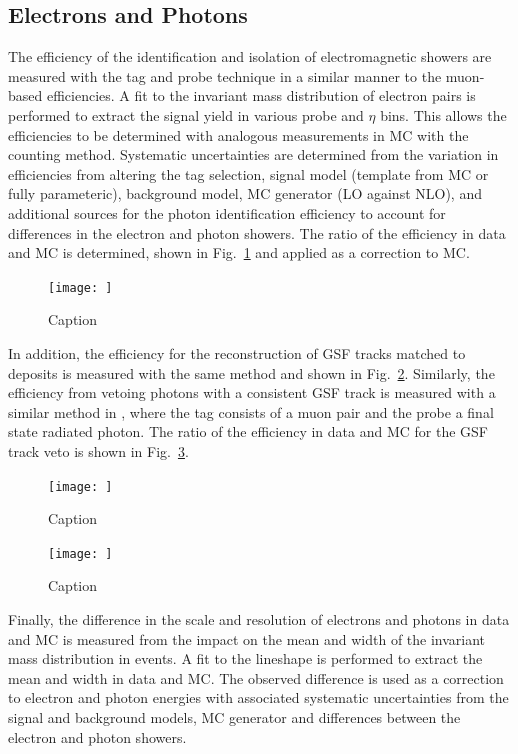 \subsection{Electrons and Photons}

The efficiency of the identification and isolation of electromagnetic showers
are measured with the tag and probe technique in a similar manner to the
muon-based efficiencies. A fit to the invariant mass distribution of electron
pairs is performed to extract the signal yield in various probe \pt and $\eta$
bins. This allows the efficiencies to be determined with analogous
measurements in MC with the counting method. Systematic uncertainties are
determined from the variation in efficiencies from altering the tag selection,
signal model (template from MC or fully parameteric), background model, MC
generator (LO against NLO), and additional sources for the photon
identification efficiency to account for differences in the electron and
photon showers. The ratio of the efficiency in data and MC is determined,
shown in Fig.~\ref{fig:egamma-id-iso-efficiency} and applied as a correction
to MC.

\begin{figure}[htbp]
    \centering
    \texttt{[image: ]}
    \caption{Caption}
    \label{fig:egamma-id-iso-efficiency}
\end{figure}

In addition, the efficiency for the reconstruction of GSF tracks matched to
\ECAL deposits is measured with the same method and shown in
Fig.~\ref{fig:electron-reco-efficiency}. Similarly, the efficiency from
vetoing photons with a consistent GSF track is measured with a similar method
in \IDYmmg, where the tag consists of a muon pair and the probe a
final state radiated photon. The ratio of the efficiency in data and MC for
the GSF track veto is shown in Fig.~\ref{fig:photon-trackveto-efficiency}.

\begin{figure}[htbp]
    \centering
    \texttt{[image: ]}
    \caption{Caption}
    \label{fig:electron-reco-efficiency}
\end{figure}

\begin{figure}[htbp]
    \centering
    \texttt{[image: ]}
    \caption{Caption}
    \label{fig:photon-trackveto-efficiency}
\end{figure}

Finally, the difference in the scale and resolution of electrons and photons
in data and MC is measured from the impact on the mean and width of the
invariant mass distribution in \IDYee events. A fit to the \PZ lineshape is
performed to extract the mean and width in data and MC. The observed
difference is used as a correction to electron and photon energies with
associated systematic uncertainties from the signal and background models, MC
generator and differences between the electron and photon showers.

